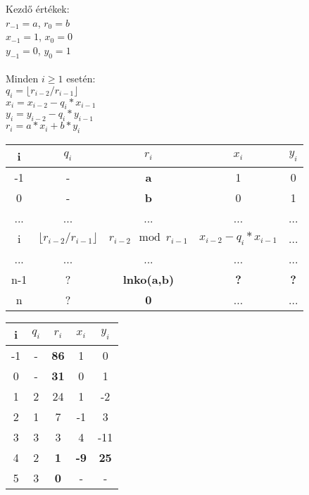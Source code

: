 \documentclass[12pt,a4paper]{article}
\begin{document}
Kezdő értékek:\\
$r_{-1} = a$, $r_0 = b$\\
$x_{-1} = 1$, $x_0 = 0$\\
$y_{-1} = 0$, $y_0 = 1$\\
\\
Minden $i \ge 1$ esetén:\\
$q_i = \lfloor r_{i-2} / r_{i-1} \rfloor $\\
$x_i = x_{i-2} - q_i * x_{i-1}$\\
$y_i = y_{i-2} - q_i * y_{i-1}$\\
$r_i = a*x_i + b*y_i$

\begin{table}[h]
\begin{tabular}{|c|c|c|c|c|}
	\hline
	i & $q_i$ & $r_i$ & $x_i$ & $y_i$ \\
	\hline
	-1 & - & \textbf{a} & 1 & 0 \\
	\hline
	0 & - & \textbf{b} & 0 & 1 \\
	\hline
	... & ... & ... & ... & ... \\
	\hline
	i & $\lfloor r_{i-2}/r_{i-1} \rfloor$ & $r_{i-2} \mod r_{i-1}$ &
	$x_{i-2}-q_i*x_{i-1}$ & ... \\
	\hline
	... & ... & ... & ... & ... \\
	\hline
	n-1 & ? & \textbf{lnko(a,b)} & \textbf{?} & \textbf{?} \\
	\hline
	n & ? & \textbf{0} & ... & ... \\
	\hline
\end{tabular}
\end{table}

\begin{table}[h]
\begin{tabular}{|c|c|c|c|c|}
	\hline
	i & $q_i$ & $r_i$ & $x_i$ & $y_i$ \\
	\hline
	-1 & - & \textbf{86} & 1 & 0 \\
	\hline
	0 & - & \textbf{31} & 0 & 1 \\
	\hline
	1 & 2 & 24 & 1 & -2 \\
	\hline
	2 & 1 & 7 & -1 & 3 \\
	\hline
	3 & 3 & 3 & 4 & -11 \\
	\hline
	4 & 2 & \textbf{1} & \textbf{-9} & \textbf{25} \\
	\hline
	5 & 3 & \textbf{0} & - & - \\
	\hline
\end{tabular}
\end{table}
\end{document}
